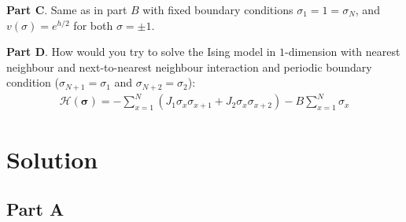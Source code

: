 \documentclass[12pt,a4paper]{report}
\begin{document}
\begin{exo}
    \medskip

    \textbf{Part C}. Same as in part $B$ with fixed boundary conditions $\sigma_1 = 1 = \sigma_N$, and $v(\sigma) = e^{h/2}$ for both $\sigma=\pm 1$.
    
    \medskip

    \textbf{Part D}. How would you try to solve the Ising model in $1$-dimension with nearest neighbour and next-to-nearest neighbour interaction and periodic boundary condition ($\sigma_{N+1} = \sigma_1$ and $\sigma_{N+2} = \sigma_2$):
    \begin{align*}
        \mathcal{H}(\bm{\sigma}) = -\sum_{x=1}^N (J_1 \sigma_x \sigma_{x+1} + J_2 \sigma_x \sigma_{x+2}) - B \sum_{x=1}^N \sigma_x
    \end{align*} 

\end{exo}

\section{Solution}
    \subsection{Part A}
\end{document}
